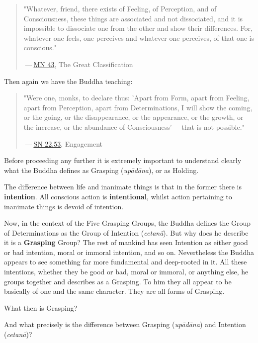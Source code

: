 \begin{quotation}
"Whatever, friend, there exists of Feeling, of
Perception, and of Consciousness, these things are associated and not
dissociated, and it is impossible to dissociate one from the other and
show their differences. For, whatever one feels, one perceives and
whatever one perceives, of that one is conscious."


 — \href{https://suttacentral.net/mn43/en/sujato}{MN 43}, The Great Classification


\end{quotation}

Then again we have the Buddha teaching:


\begin{quotation}
"Were one, monks, to declare
thus: 'Apart from Form, apart from Feeling, apart from Perception, apart
from Determinations, I will show the coming, or the going, or the
disappearance, or the appearance, or the growth, or the increase, or the
abundance of Consciousness' — that is not possible."


 — \href{https://suttacentral.net/sn22.53/en/bodhi}{SN 22.53}, Engagement


\end{quotation}

Before proceeding any further it is extremely important to understand
clearly what the Buddha defines as Grasping (\emph{upādāna}), or as
Holding.


The difference between life and inanimate things is that in the former
there is \textbf{intention}. All conscious action is \textbf{intentional}, whilst
action pertaining to inanimate things is devoid of intention.


Now, in the context of the Five Grasping Groups, the Buddha defines the
Group of Determinations as the Group of Intention (\emph{cetanā}). But why
does he describe it is a \textbf{Grasping} Group? The rest of mankind has seen
Intention as either good or bad intention, moral or immoral intention,
and so on. Nevertheless the Buddha appears to see something far more
fundamental and deep-rooted in it. All these intentions, whether they be
good or bad, moral or immoral, or anything else, he groups together and
describes as a Grasping. To him they all appear to be basically of one
and the same character. They are all forms of Grasping.


What then is Grasping?


And what precisely is the difference between Grasping (\emph{upādāna}) and
Intention (\emph{cetanā})?



